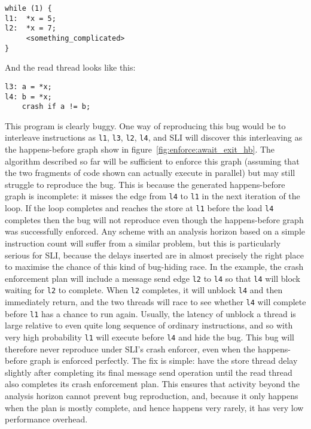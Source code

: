 \begin{verbatim}
while (1) {
l1:  *x = 5;
l2:  *x = 7;
     <something_complicated>
}
\end{verbatim}

And the read thread looks like this:

\begin{verbatim}
l3: a = *x;
l4: b = *x;
    crash if a != b;
\end{verbatim}

This program is clearly buggy.  One way of reproducing this bug would
be to interleave instructions as \verb|l1|, \verb|l3|, \verb|l2|,
\verb|l4|, and SLI will discover this interleaving as the
happens-before graph show in figure~\ref{fig:enforce:await_exit_hb}.
The algorithm described so far will be sufficient to enforce this
graph (assuming that the two fragments of code shown can actually
execute in parallel) but may still struggle to reproduce the bug.
This is because the generated happens-before graph is incomplete: it
misses the edge from \verb|l4| to \verb|l1| in the next iteration of
the loop.  If the loop completes and reaches the store at \verb|l1|
before the load \verb|l4| completes then the bug will not reproduce
even though the happens-before graph was successfully enforced.  Any
scheme with an analysis horizon based on a simple instruction count
will suffer from a similar problem, but this is particularly serious
for SLI, because the delays inserted are in almost precisely the right
place to maximise the chance of this kind of bug-hiding race.  In the
example, the crash enforcement plan will include a message send edge
\verb|l2| to \verb|l4| so that \verb|l4| will block waiting for
\verb|l2| to complete.  When \verb|l2| completes, it will unblock
\verb|l4| and then immediately return, and the two threads will race
to see whether \verb|l4| will complete before \verb|l1| has a chance
to run again.  Usually, the latency of unblock a thread is large
relative to even quite long sequence of ordinary instructions, and so
with very high probability \verb|l1| will execute before \verb|l4| and
hide the bug.  This bug will therefore never reproduce under SLI's
crash enforcer, even when the happens-before graph is enforced
perfectly.  The fix is simple: have the store thread delay slightly
after completing its final message send operation until the read
thread also completes its crash enforcement plan.  This ensures that
activity beyond the analysis horizon cannot prevent bug reproduction,
and, because it only happens when the plan is mostly complete, and
hence happens very rarely, it has very low performance overhead.

